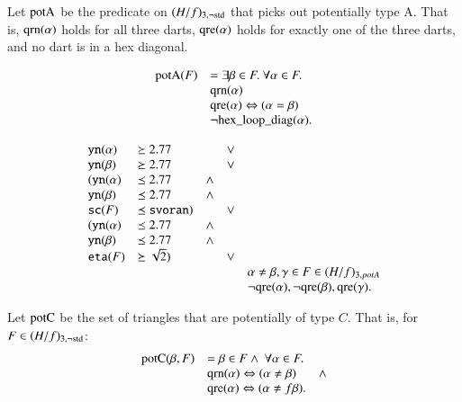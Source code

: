  Let ${\operatorname{potA}}$ be the predicate on $(H/f)_{3,\neg{\operatorname{std}}}$
that picks out potentially type A.  That is, ${\operatorname{qrn}}(\alpha)$
holds for all three darts, ${\operatorname{qre}}(\alpha)$ holds for exactly
one of the three darts, and no dart is in a hex diagonal.

\begin{equation}
    \begin{array}{lll}
    {\operatorname{potA}}(F) &= \exists\beta\in F.\ \forall\alpha\in F. \\
        &{\operatorname{qrn}}(\alpha)\\
        &{\operatorname{qre}}(\alpha) \Leftrightarrow (\alpha=\beta)\\
        &\neg{\operatorname{hex\_loop\_diag}}(\alpha).
    \end{array}
\end{equation}

\begin{equation}
 \begin{array}{lllll}
    {\operatorname{{\texttt{yn}}}}(\alpha) &\succeq 2.77 &&\vee\\
      {\operatorname{{\texttt{yn}}}}(\beta) &\succeq 2.77 &&\vee\\
    ({\operatorname{{\texttt{yn}}}}(\alpha) &\preceq 2.77 &\wedge\\
      {\operatorname{{\texttt{yn}}}}(\beta) &\preceq 2.77 &\wedge\\
      {\operatorname{{\texttt{sc}}}}(F) &\preceq {\operatorname{{\texttt{svoran}}}}) &&\vee\\
   ({\operatorname{{\texttt{yn}}}}(\alpha) &\preceq 2.77 &\wedge\\
      {\operatorname{{\texttt{yn}}}}(\beta) &\preceq 2.77 &\wedge\\
      {\operatorname{{\texttt{eta}}}}(F) &\succeq \sqrt2) &&\vee\\
     &&&&\alpha\ne\beta,\gamma\in F\in (H/f)_{3,potA}\\
     &&&&\neg{\operatorname{qre}}(\alpha),\neg{\operatorname{qre}}(\beta),{\operatorname{qre}}(\gamma).
 \end{array}
\end{equation}

Let ${\operatorname{potC}}$ be the set of triangles that are potentially of
type $C$. That is, for $F\in (H/f)_{3,\neg{\operatorname{std}}}$:
\begin{equation}
    \begin{array}{lll}
    {\operatorname{potC}}(\beta,F) &= \beta\in F \wedge\ \forall\alpha\in F. \\
        &{\operatorname{qrn}}(\alpha)\Leftrightarrow (\alpha\ne\beta)&\wedge \\
        &{\operatorname{qre}}(\alpha) \Leftrightarrow (\alpha\ne f\beta).
    \end{array}
\end{equation}














